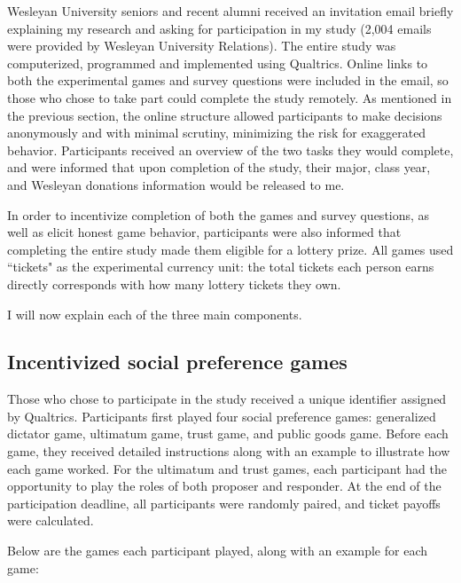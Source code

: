 \documentclass[12pt]{article}
\begin{document}
Wesleyan University seniors and recent alumni received an invitation email briefly explaining my research and asking for participation in my study (2,004 emails were provided by Wesleyan University Relations). The entire study was computerized, programmed and implemented using Qualtrics. Online links to both the experimental games and survey questions were included in the email, so those who chose to take part could complete the study remotely. As mentioned in the previous section, the online structure allowed participants to make decisions anonymously and with minimal scrutiny, minimizing the risk for exaggerated behavior. Participants received an overview of the two tasks they would complete, and were informed that upon completion of the study, their major, class year, and Wesleyan donations information would be released to me.

In order to incentivize completion of both the games and survey questions, as well as elicit honest game behavior, participants were also informed that completing the entire study made them eligible for a lottery prize. All games used ``tickets" as the experimental currency unit: the total tickets each person earns directly corresponds with how many lottery tickets they own.

I will now explain each of the three main components.

\subsection{Incentivized social preference games}

Those who chose to participate in the study received a unique identifier assigned by Qualtrics. Participants first played four social preference games: generalized dictator game, ultimatum game, trust game, and public goods game. Before each game, they received detailed instructions along with an example to illustrate how each game worked. For the ultimatum and trust games, each participant had the opportunity to play the roles of both proposer and responder. At the end of the participation deadline, all participants were randomly paired, and ticket payoffs were calculated.

Below are the games each participant played, along with an example for each game: 
\end{document}
